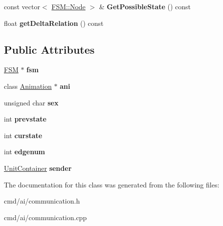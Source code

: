 \begin{DoxyCompactItemize}
\item 
const vector$<$ \hyperlink{structFSM_1_1Node}{F\+S\+M\+::\+Node} $>$ \& {\bfseries Get\+Possible\+State} () const \hypertarget{classCommunicationMessage_a40398bc299a38c82b061e52dba41c5c7}{}\label{classCommunicationMessage_a40398bc299a38c82b061e52dba41c5c7}

\item 
float {\bfseries get\+Delta\+Relation} () const \hypertarget{classCommunicationMessage_aa37ce0a31d89fa251e0d50b34d2f543d}{}\label{classCommunicationMessage_aa37ce0a31d89fa251e0d50b34d2f543d}

\end{DoxyCompactItemize}
\subsection*{Public Attributes}
\begin{DoxyCompactItemize}
\item 
\hyperlink{classFSM}{F\+SM} $\ast$ {\bfseries fsm}\hypertarget{classCommunicationMessage_ac255eed86b15fa129e4c68eec3be900b}{}\label{classCommunicationMessage_ac255eed86b15fa129e4c68eec3be900b}

\item 
class \hyperlink{classAnimation}{Animation} $\ast$ {\bfseries ani}\hypertarget{classCommunicationMessage_a98ce22cc3f80a67c44a9f0bcf58ef661}{}\label{classCommunicationMessage_a98ce22cc3f80a67c44a9f0bcf58ef661}

\item 
unsigned char {\bfseries sex}\hypertarget{classCommunicationMessage_a8748c20dcc4027f0369a1fe2b7eb31fe}{}\label{classCommunicationMessage_a8748c20dcc4027f0369a1fe2b7eb31fe}

\item 
int {\bfseries prevstate}\hypertarget{classCommunicationMessage_a8e0683c1d5164263f4414ac55e44ea32}{}\label{classCommunicationMessage_a8e0683c1d5164263f4414ac55e44ea32}

\item 
int {\bfseries curstate}\hypertarget{classCommunicationMessage_af435ec0bc8296b3cfb1bb37cce91a5f6}{}\label{classCommunicationMessage_af435ec0bc8296b3cfb1bb37cce91a5f6}

\item 
int {\bfseries edgenum}\hypertarget{classCommunicationMessage_a459612f94c76cd11bd03f93a937f523e}{}\label{classCommunicationMessage_a459612f94c76cd11bd03f93a937f523e}

\item 
\hyperlink{classUnitContainer}{Unit\+Container} {\bfseries sender}\hypertarget{classCommunicationMessage_a8d6b50a6cbfd9722a1306f21de503fe9}{}\label{classCommunicationMessage_a8d6b50a6cbfd9722a1306f21de503fe9}

\end{DoxyCompactItemize}


The documentation for this class was generated from the following files\+:\begin{DoxyCompactItemize}
\item 
cmd/ai/communication.\+h\item 
cmd/ai/communication.\+cpp\end{DoxyCompactItemize}

